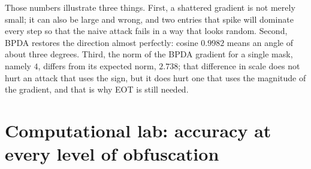Those numbers illustrate three things. First, a shattered gradient is not merely small; it can
also be large and wrong, and two entries that spike will dominate every step
so that the naive attack fails in a way that looks random. Second, BPDA restores the direction
almost perfectly: cosine $0.9982$ means an angle of about three degrees. Third,
the norm of the BPDA gradient for a single mask, namely $4$, differs from its expected norm, $2.738$;
that difference in scale does not hurt an attack that uses the sign, but it does hurt one that uses
the magnitude of the gradient, and that is why EOT is still needed.


\section{Computational lab: accuracy at every level of obfuscation}

